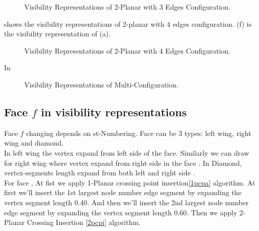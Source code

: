 \begin{figure}[!tb]
\centering
\resizebox{150mm}{!}{}
\caption{Visibility Representations of 2-Planar with 3 Edges Configuration.}
\label{fig:2planar3edgesvisi}
\end{figure}



 shows the visibility representations of 2-planar with 4 edges configuration. (f) is the visibility representation of (a).
\begin{figure}[!tb]
\centering
\resizebox{100mm}{!}{}
\caption{Visibility Representations of 2-Planar with 4 Edges Configuration.}
\label{fig:2planar4edgesvisi}
\end{figure}









In 
\begin{figure}[!tb]
\centering
\resizebox{150mm}{!}{}
\caption{Visibility Representations of Multi-Configuration.}
\label{fig:starvisi}
\end{figure}





\subsection{Face $f$ in visibility representations}

Face $f$ changing depends on st-Numbering. Face can be 3 types: left wing, right wing and diamond.
\\
In left wing  the vertex  expand from left side of the face. Similarly we can draw for right wing where vertex expand from right side in the face . In Diamond, vertex-segments length expand from both left and right side .
\\
For face , At fist we apply 1-Planar crossing point insertion\ref{1pcpa} algorithm.  At first we'll insert the 1st largest node number edge segment  by expanding the vertex segment length 0.40. And then  we'll insert the 2nd largest node number edge segment  by expanding the vertex segment length 0.60. Then  we apply 2-Planar Crossing Insertion \ref{2pcpi} algorithm.



